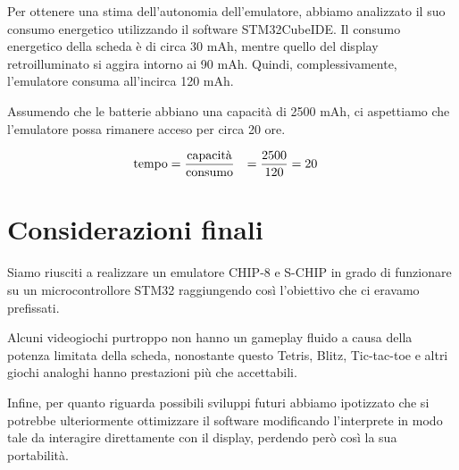 \documentclass[a4paper]{article}
\begin{document}
Per ottenere una stima dell'autonomia dell'emulatore, abbiamo analizzato il suo consumo
energetico utilizzando il software STM32CubeIDE. Il consumo energetico della scheda è di
circa 30 mAh, mentre quello del display retroilluminato si aggira intorno ai 90 mAh.
Quindi, complessivamente, l'emulatore consuma all'incirca 120 mAh.

Assumendo che le batterie abbiano una capacità di 2500 mAh, ci aspettiamo che
l'emulatore possa rimanere acceso per circa 20 ore.

\begin{equation*}
    \begin{aligned}
        \textmd{tempo} & = \frac{\textmd{capacità}}{\textmd{consumo}} & = \frac{2500}{120} & = 20
    \end{aligned}
\end{equation*}

\section{Considerazioni finali}

Siamo riusciti a realizzare un emulatore CHIP-8 e S-CHIP in grado di funzionare su un
microcontrollore STM32 raggiungendo così l'obiettivo che ci eravamo prefissati.

Alcuni videogiochi purtroppo non hanno un gameplay fluido a causa della potenza
limitata della scheda, nonostante questo Tetris, Blitz, Tic-tac-toe e altri giochi
analoghi hanno prestazioni più che accettabili.

Infine, per quanto riguarda possibili sviluppi futuri abbiamo ipotizzato che si potrebbe
ulteriormente ottimizzare il software modificando l'interprete in modo tale da interagire
direttamente con il display, perdendo però così la sua portabilità.

%



\end{document}
